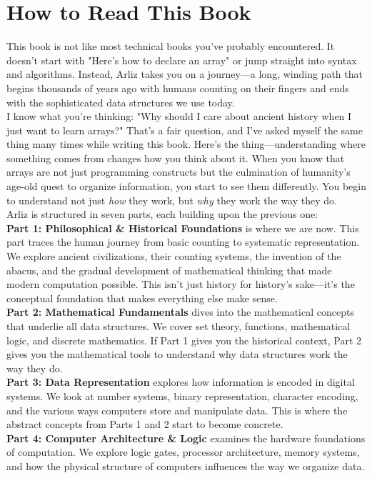 \documentclass[12pt, oneside, openany]{book}
\begin{document}
\chapter*{How to Read This Book}

This book is not like most technical books you've probably encountered. It doesn't start with "Here's how to declare an array" or jump straight into syntax and algorithms. Instead, Arliz takes you on a journey—a long, winding path that begins thousands of years ago with humans counting on their fingers and ends with the sophisticated data structures we use today.\\
I know what you're thinking: "Why should I care about ancient history when I just want to learn arrays?" That's a fair question, and I've asked myself the same thing many times while writing this book. Here's the thing—understanding where something comes from changes how you think about it. When you know that arrays are not just programming constructs but the culmination of humanity's age-old quest to organize information, you start to see them differently. You begin to understand not just \emph{how} they work, but \emph{why} they work the way they do.\\
Arliz is structured in seven parts, each building upon the previous one:\\
\textbf{Part 1: Philosophical \& Historical Foundations} is where we are now. This part traces the human journey from basic counting to systematic representation. We explore ancient civilizations, their counting systems, the invention of the abacus, and the gradual development of mathematical thinking that made modern computation possible. This isn't just history for history's sake—it's the conceptual foundation that makes everything else make sense.\\
\textbf{Part 2: Mathematical Fundamentals} dives into the mathematical concepts that underlie all data structures. We cover set theory, functions, mathematical logic, and discrete mathematics. If Part 1 gives you the historical context, Part 2 gives you the mathematical tools to understand why data structures work the way they do.\\
\textbf{Part 3: Data Representation} explores how information is encoded in digital systems. We look at number systems, binary representation, character encoding, and the various ways computers store and manipulate data. This is where the abstract concepts from Parts 1 and 2 start to become concrete.\\
\textbf{Part 4: Computer Architecture \& Logic} examines the hardware foundations of computation. We explore logic gates, processor architecture, memory systems, and how the physical structure of computers influences the way we organize data.\\
\end{document}
